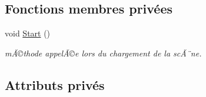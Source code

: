 \subsection*{Fonctions membres privées}
\begin{DoxyCompactItemize}
\item 
void \mbox{\hyperlink{class_parameters_aa31bc8929b4008944bd7f720bfac9a62}{Start}} ()
\begin{DoxyCompactList}\small\item\em mÃ©thode appelÃ©e lors du chargement de la scÃ¨ne. \end{DoxyCompactList}\end{DoxyCompactItemize}
\subsection*{Attributs privés}

